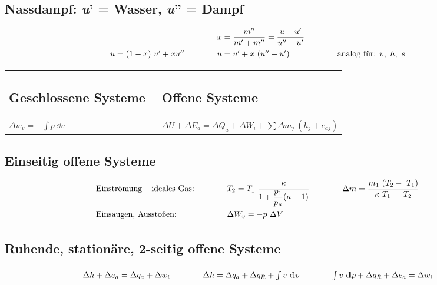 \subsection{Nassdampf:  \textit{u}'  = Wasser,  \textit{u}''  = Dampf}
%
	\setlength{\abovedisplayshortskip}{-18pt}
		\[ \arraycolsep=2em  \def\arraystretch{1.5}
		\begin{array}{lll}
			                      & x = \dfrac{m''}{m'+m''} = \dfrac{u-u'}{u''-u'} &                                \\
			u = (1-x)\ u' + x u'' & u = u' + x\ (u''-u')                           & \text{analog für: }  v,\ h,\ s
		\end{array} \]
%
\vspace {-1em}
%
\begin{flushleft}
	\setlength{\tabcolsep}{0em} %
	\begin{tabular}{lp{4em}l}
		\parbox{6cm}{\subsection{Geschlossene Systeme}} &  & \parbox{5cm}{\subsection{Offene Systeme}}                                                        \\
		\qquad  $ \Delta w_v = -\int p \ \dd v $        &  & \qquad $ \Delta U + \Delta E_a = \Delta Q_a + \Delta W_i + \sum \Delta m_j \ (h_j+ e_{aj}) $
	\end{tabular}
\end{flushleft}

\subsection{Einseitig offene Systeme}
%
	\setlength{\abovedisplayskip}{-20pt} %
		\[ \arraycolsep=2em %
		\begin{array}{lll}
			\text{Einströmung -- ideales Gas:} &  T_2 = T_1\ \dfrac{\kappa}{1+\dfrac{p_1}{p_u}(\kappa-1)}  &  \Delta m = \dfrac{m_1\ (T_2-\ T_1)}{\kappa\ T_1-\ T_2}  \\
			\text{Einsaugen, Ausstoßen:}       &  \Delta W_v = -p\ \Delta V                                &
		\end{array} \]

\subsection{Ruhende, stationäre, 2-seitig offene Systeme}
%
	\setlength{\abovedisplayskip}{-20pt}
	\[\arraycolsep=2em
		\begin{array}{lll}
			\Delta h + \Delta e_a = \Delta q_a + \Delta w_i & \Delta h = \Delta q_a + \Delta q_R + \int v\ \dd p & \int v\ \dd p + \Delta q_R + \Delta e_a = \Delta w_i
		\end{array} \]

